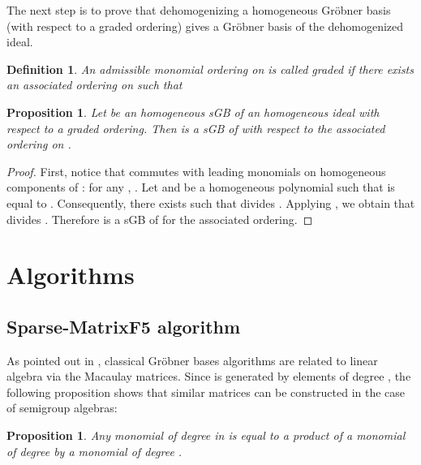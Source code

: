 \documentclass[12pt]{article}
\numberwithin{equation}{section}
\numberwithin{theorem}{section}
\newtheorem{proposition}[theorem]{Proposition}
\newtheorem{definition}[theorem]{Definition}
\begin{document}
The next step is to prove that dehomogenizing a homogeneous Gr\"obner basis (with respect to a graded ordering) gives a Gr\"obner basis of the dehomogenized ideal.

\begin{definition}
An admissible monomial ordering  on 
 is called \emph{graded} if there exists an associated ordering  on  such that

\end{definition}
\begin{proposition}\label{prop:deshom}
Let  be an homogeneous sGB of an homogeneous ideal  with respect to a graded ordering. Then 
 is a sGB of  with respect to the associated ordering on .
\end{proposition}

\begin{proof}
First, notice that  commutes with leading monomials on homogeneous components of : for any , . Let  and  be a homogeneous polynomial such that  is equal to . Consequently, there exists  such that  divides . Applying , we obtain that  divides . Therefore  is a sGB of  for the associated ordering.
\end{proof}

\section{Algorithms}\label{sec:algos}
\subsection{Sparse-MatrixF5 algorithm}
As pointed out in \cite{lazard1983grobner}, classical Gr\"obner bases algorithms are related to linear algebra via the Macaulay matrices.
Since  is generated by elements of degree , the following proposition shows that similar matrices can be constructed in the case of semigroup algebras:
\begin{proposition}
Any monomial of degree  in  is equal to a product
of a monomial of degree  by a monomial of degree .
\end{proposition}
\end{document}
